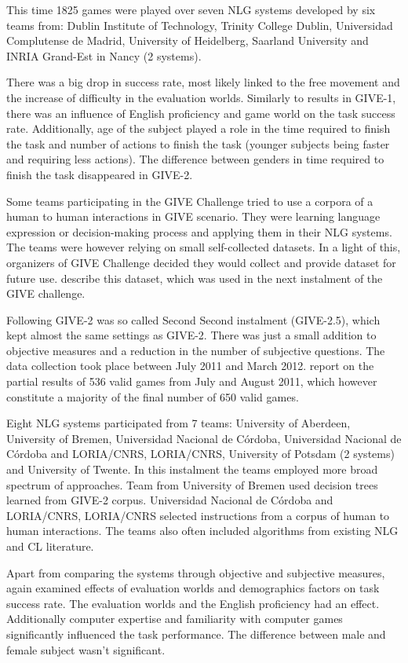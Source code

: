 This time 1825 games were played over seven NLG systems developed by six teams from: Dublin Institute of Technology, Trinity College Dublin, Universidad Complutense de Madrid, University of Heidelberg, Saarland University and INRIA Grand-Est in Nancy (2 systems).

There was a big drop in success rate, most likely linked to the free movement and the increase of difficulty in the evaluation worlds. Similarly to results in GIVE-1, there was an influence of English proficiency and game world on the task success rate. Additionally, age of the subject played a role in the time required to finish the task and number of actions to finish the task (younger subjects being faster and requiring less actions). The difference between genders in time required to finish the task disappeared in GIVE-2.

Some teams participating in the GIVE Challenge tried to use a corpora of a human to human interactions in GIVE scenario. They were learning language expression or decision-making process and applying them in their NLG systems. The teams were however relying on small self-collected datasets. In a light of this, organizers of GIVE Challenge decided they would collect and provide dataset for future use. \citet{gargett2010give} describe this dataset, which was used in the next instalment of the GIVE challenge.

Following GIVE-2 was so called Second Second instalment (GIVE-2.5), which kept almost the same settings as GIVE-2. There was just a small addition to objective measures and a reduction in the number of subjective questions. The data collection took place between July 2011 and March 2012. \citet{striegnitz2011report} report on the partial results of 536 valid games from July and August 2011, which however constitute a majority of the final number of 650 valid games.

Eight NLG systems participated from 7 teams: University of Aberdeen, University of Bremen, Universidad Nacional de Córdoba, Universidad Nacional de Córdoba and LORIA/CNRS, LORIA/CNRS, University of Potsdam (2 systems) and University of Twente. In this instalment the teams employed more broad spectrum of approaches. Team from University of Bremen used decision trees learned from GIVE-2 corpus. Universidad Nacional de Córdoba and LORIA/CNRS, LORIA/CNRS selected instructions from a corpus of human to human interactions. The teams also often included algorithms from existing NLG and CL literature.

Apart from comparing the systems through objective and subjective measures, \citet{striegnitz2011report} again examined effects of evaluation worlds and demographics factors on task success rate. The evaluation worlds and the English proficiency had an effect. Additionally computer expertise and familiarity with computer games significantly influenced the task performance. The difference between male and female subject wasn't significant.



